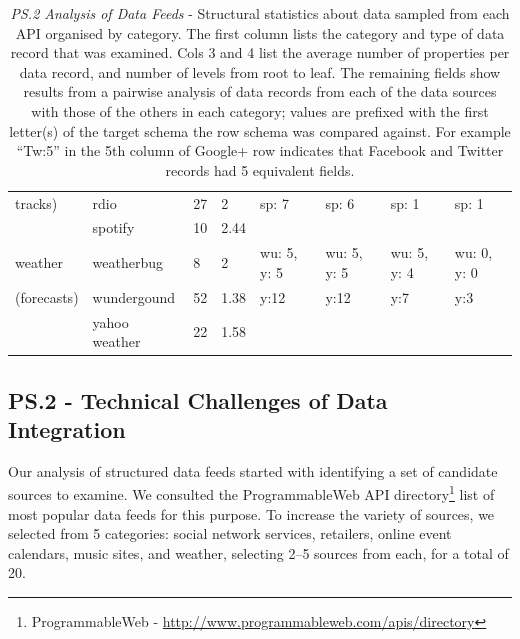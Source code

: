 \documentclass{sigchi}
\begin{document}
\begin{table}[htb]
\begin{tabular}{p{2.0cm}  p{1.8cm}  p{1.8cm}  p{1.8cm}  p{1.8cm}  p{1.8cm}  p{1.8cm}  p{1.8cm}}
tracks)			& rdio			& 27						& 2						& sp: 7			& sp: 6					& sp: 1					& sp: 1 \\
				& spotify			& 10						& 2.44					&				&						&						& \\
\hline
weather			& weatherbug		& 8						& 2						& wu: 5, y: 5		& wu: 5, y: 5				& wu: 5, y: 4				& wu: 0, y: 0 \\
(forecasts)		& wundergound	& 52						& 1.38					& y:12			& y:12					& y:7						& y:3 \\
				& yahoo weather	& 22						& 1.58					&				&						&						& \\
\end{tabular}
\caption{\emph{PS.2 Analysis of Data Feeds} - Structural statistics about data sampled from each API organised by category.  The first column lists the category and type of data record that was examined.  Cols 3 and 4 list the average number of properties per data record, and number of levels from root to leaf. The remaining fields show results from a pairwise analysis of data records from each of the data sources with those of the others in each category; values are prefixed with the first letter(s) of the target schema the row schema was compared against. For example ``Tw:5'' in the 5th column of Google+ row indicates that Facebook and Twitter records had 5 equivalent fields. }\label{tbl:prestudy2}
\end{table}


\subsection{PS.2 - Technical Challenges of Data Integration}
Our analysis of structured data feeds started with identifying a set of candidate sources to examine.  We consulted the ProgrammableWeb API directory\footnote{ProgrammableWeb - \url{http://www.programmableweb.com/apis/directory}} list of most popular data feeds for this purpose.  To increase the variety of sources, we selected from 5 categories: social network services, retailers, online event calendars, music sites, and weather, selecting 2--5 sources from each, for a total of 20.  
\end{document}
